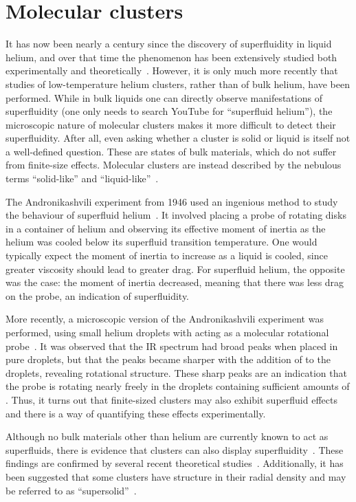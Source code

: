 \section{Molecular clusters}

It has now been nearly a century since the discovery of superfluidity in liquid helium, and over that time the phenomenon has been extensively studied both experimentally and theoretically~\cite{balibar2007discovery}.
However, it is only much more recently that studies of low-temperature helium clusters, rather than of bulk helium, have been performed.
While in bulk liquids one can directly observe manifestations of superfluidity (one only needs to search YouTube for ``superfluid helium''), the microscopic nature of molecular clusters makes it more difficult to detect their superfluidity.
After all, even asking whether a cluster is solid or liquid is itself not a well-defined question.
These are states of bulk materials, which do not suffer from finite-size effects.
Molecular clusters are instead described by the nebulous terms ``solid-like'' and ``liquid-like''~\cite{cuervo2008solid}.

The Andronikashvili experiment from 1946 used an ingenious method to study the behaviour of superfluid helium~\cite{grebenev1998superfluidity}.
It involved placing a probe of rotating disks in a container of helium and observing its effective moment of inertia as the helium was cooled below its superfluid transition temperature.
One would typically expect the moment of inertia to increase as a liquid is cooled, since greater viscosity should lead to greater drag.
For superfluid helium, the opposite was the case: the moment of inertia decreased, meaning that there was less drag on the probe, an indication of superfluidity.

More recently, a microscopic version of the Andronikashvili experiment was performed, using small helium droplets with  acting as a molecular rotational probe~\cite{grebenev1998superfluidity}.
It was observed that the  IR spectrum had broad peaks when placed in pure  droplets, but that the peaks became sharper with the addition of  to the droplets, revealing rotational structure.
These sharp peaks are an indication that the  probe is rotating nearly freely in the droplets containing sufficient amounts of .
Thus, it turns out that finite-sized clusters may also exhibit superfluid effects and there is a way of quantifying these effects experimentally.

Although no bulk materials other than helium are currently known to act as superfluids, there is evidence that \paraH{} clusters can also display superfluidity~\cite{grebenev2000evidence}.
These findings are confirmed by several recent theoretical studies~\cite{li2010molecular,raston2012persistent,zeng2012simulating,zeng2013probing}.
Additionally, it has been suggested that some \paraH{} clusters have structure in their radial density and may be referred to as ``supersolid''~\cite{sindzingre1991superfluidity}.

